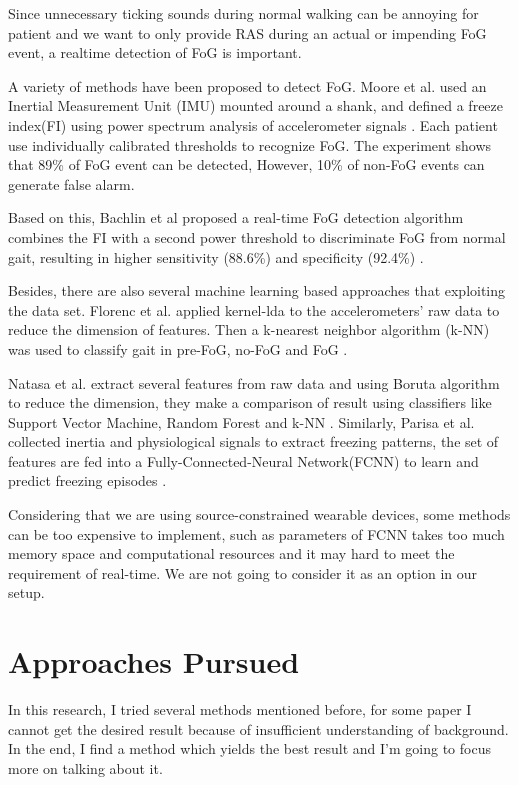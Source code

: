 \documentclass[article]{article}
\begin{document}
 	Since unnecessary ticking sounds during normal walking can be annoying for patient and we want to only provide RAS during an actual or impending FoG event, a realtime detection of FoG is important.
 	
 	  
 	A variety of methods have been proposed to detect FoG. Moore et al. used an Inertial Measurement Unit (IMU) mounted around a shank, and defined a freeze index(FI) using power spectrum analysis of accelerometer signals \cite{FI}. Each patient use individually calibrated thresholds to recognize FoG. The experiment shows that 89\% of FoG event can be detected, However, 10\% of non-FoG events can generate false alarm. 
 	
 	Based on this, Bachlin et al proposed a real-time FoG detection algorithm combines the FI with a second power threshold to discriminate FoG from normal gait, resulting in higher sensitivity (88.6\%) and specificity (92.4\%) \cite{FI1}.
   
    Besides, there are also several machine learning based approaches that exploiting the data set. Florenc et al. applied kernel-lda to the accelerometers' raw data to reduce the dimension of features. Then a k-nearest neighbor algorithm (k-NN) was used to classify gait in pre-FoG, no-FoG and FoG \cite{Flo}. 
    
    Natasa et al. extract several features from raw data and using Boruta algorithm to reduce the dimension, they make a comparison of result using classifiers like Support Vector Machine, Random Forest and k-NN \cite{ML}.
    Similarly, Parisa et al. collected  inertia and physiological signals to extract freezing patterns, the set of features are fed into a Fully-Connected-Neural Network(FCNN) to learn and predict freezing episodes \cite{symptoms}.
    
    Considering that we are using source-constrained wearable devices, some methods can be too expensive to implement, such as parameters of FCNN takes too much memory space and computational resources and it may hard to meet the requirement of real-time. We are not going to consider it as an option in our setup.

 
    
\section{Approaches Pursued}

	In this research, I tried several methods mentioned before, for some paper I cannot get the desired result because of insufficient understanding of background. In the end, I find a method which yields the best result and I'm going to focus more on talking about it.
	
\end{document}
